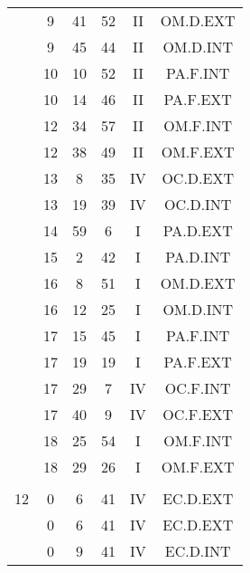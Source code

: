 \documentclass[12pt, a4paper]{article}
\begin{document}
\begin{multicols}{3}
{\begin{tabular}{c c c c c c}
	 	 	 	 & 9 & 41 & 52 & II & OM.D.EXT\\%
	 	 	 	 & 9 & 45 & 44 & II & OM.D.INT\\%
	 	 	 	 & 10 & 10 & 52 & II & PA.F.INT\\%
	 	 	 	 & 10 & 14 & 46 & II & PA.F.EXT\\%
	 	 	 	 & 12 & 34 & 57 & II & OM.F.INT\\%
	 	 	 	 & 12 & 38 & 49 & II & OM.F.EXT\\%
	 	 	 	 & 13 & 8 & 35 & IV & OC.D.EXT\\%
	 	 	 	 & 13 & 19 & 39 & IV & OC.D.INT\\%
	 	 	 	 & 14 & 59 & 6 & I & PA.D.EXT\\%
	 	 	 	 & 15 & 2 & 42 & I & PA.D.INT\\%
	 	 	 	 & 16 & 8 & 51 & I & OM.D.EXT\\%
	 	 	 	 & 16 & 12 & 25 & I & OM.D.INT\\%
	 	 	 	 & 17 & 15 & 45 & I & PA.F.INT\\%
	 	 	 	 & 17 & 19 & 19 & I & PA.F.EXT\\%
	 	 	 	 & 17 & 29 & 7 & IV & OC.F.INT\\%
	 	 	 	 & 17 & 40 & 9 & IV & OC.F.EXT\\%
	 	 	 	 & 18 & 25 & 54 & I & OM.F.INT\\%
	 	 	 	 & 18 & 29 & 26 & I & OM.F.EXT\\%
	 	 	 	 & & & & & \\%
	 	 	 	12 & 0 & 6 & 41 & IV & EC.D.EXT\\%
	 	 	 	 & 0 & 6 & 41 & IV & EC.D.EXT\\%
	 	 	 	 & 0 & 9 & 41 & IV & EC.D.INT\\%
	 	 \end{tabular}
 	}
\end{multicols}
\end{document}

